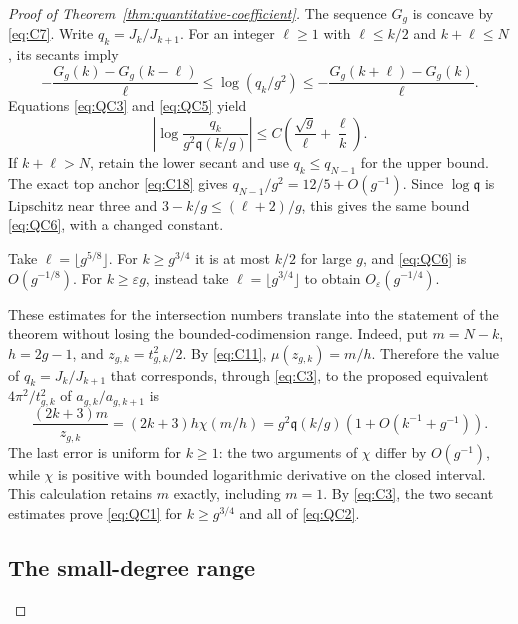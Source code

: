 \begin{proof}[Proof of Theorem~\ref{thm:quantitative-coefficient}]
The sequence $G_g$ is concave by \eqref{eq:C7}. Write
$q_k=J_k/J_{k+1}$. For an integer $\ell\ge1$ with
$\ell\le k/2$ and $k+\ell\le N$, its secants imply
\[
 -\frac{G_g(k)-G_g(k-\ell)}\ell
 \le\log(q_k/g^2)
 \le-\frac{G_g(k+\ell)-G_g(k)}\ell.
\]
Equations \eqref{eq:QC3} and \eqref{eq:QC5} yield
\begin{equation}
 \left|\log\frac{q_k}{g^2\mathfrak q(k/g)}\right|
 \le C\left(\frac{\sqrt g}\ell+\frac\ell k\right).
 \label{eq:QC6}
\end{equation}
If $k+\ell>N$, retain the lower secant and use
$q_k\le q_{N-1}$ for the upper bound. The exact top anchor
\eqref{eq:C18} gives $q_{N-1}/g^2=12/5+O(g^{-1})$.
Since $\log\mathfrak q$ is Lipschitz near three and
$3-k/g\le(\ell+2)/g$, this gives the same bound
\eqref{eq:QC6}, with a changed constant.

Take $\ell=\lfloor g^{5/8}\rfloor$. For $k\ge g^{3/4}$ it is
at most $k/2$ for large $g$, and \eqref{eq:QC6} is $O(g^{-1/8})$.
For $k\ge\varepsilon g$, instead take
$\ell=\lfloor g^{3/4}\rfloor$ to obtain $O_\varepsilon(g^{-1/4})$.

These estimates for the intersection numbers translate into the
statement of the theorem without losing the bounded-codimension range.
Indeed, put
$m=N-k$, $h=2g-1$, and $z_{g,k}=t_{g,k}^2/2$. By \eqref{eq:C11},
$\mu(z_{g,k})=m/h$. Therefore the value of $q_k=J_k/J_{k+1}$ that
corresponds, through \eqref{eq:C3}, to the proposed equivalent
$4\pi^2/t_{g,k}^2$ of $a_{g,k}/a_{g,k+1}$ is
\begin{equation}
 \frac{(2k+3)m}{z_{g,k}}
 =(2k+3)h\chi(m/h)
 =g^2\mathfrak q(k/g)\left(1+O(k^{-1}+g^{-1})\right).
 \label{eq:QC7}
\end{equation}
The last error is uniform for $k\ge1$: the two arguments of $\chi$
differ by $O(g^{-1})$, while $\chi$ is positive with bounded
logarithmic derivative on the closed interval. This calculation
retains $m$ exactly, including $m=1$. By \eqref{eq:C3}, the two
secant estimates prove \eqref{eq:QC1} for $k\ge g^{3/4}$ and all
of \eqref{eq:QC2}.

\subsection{The small-degree range}


\end{proof}
